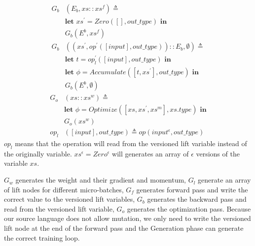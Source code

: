 \documentclass[sigplan]{acmart}\settopmatter{printfolios=true,printccs=false,printacmref=false}
\begin{document}
\begin{align*}
  G_b&(E_b, xs::xs^f)\triangleq\\
  &\textbf{let } xs^\prime=Zero([], out\_type) \textbf{ in}\\
  &G_b(E^b, xs^f)\\
  G_b&((xs^\prime, op^\prime([input], out\_type))::E_b, \emptyset)\triangleq\\
  &\textbf{let } t=op^\prime_l([input], out\_type) \textbf{ in}\\
  &\textbf{let } \phi=Accumulate([t, xs^\prime], out\_type) \textbf{ in}\\
  &G_b(E^b, \emptyset)
\end{align*}
\begin{align*}
  G_o&(xs::xs^w)\triangleq\\
  &\textbf{let } \phi=Optimize([xs,xs^\prime,xs^m], xs.type) \textbf{ in}\\
  &G_o(xs^w)\\
  op_l&([input],out\_type) \triangleq op(input^\epsilon, out\_type)
\end{align*}
$op_l$ means that the operation will read from the versioned lift variable instead of the originally variable. $xs^\epsilon = Zero^\epsilon$ will generates an array of $\epsilon$ versions of the variable $xs$.\par
$G_w$ generates the weight and their gradient and momentum, $G_l$ generate an array of lift nodes for different micro-batches, $G_f$ generates forward pass and write the correct value to the versioned lift variables, $G_b$ generates the backward pass and read from the versioned lift variable, $G_o$ generates the optimization pass. Because our source language does not allow mutation, we only need to write the versioned lift node at the end of the forward pass and the Generation phase can generate the correct training loop.
\end{document}
